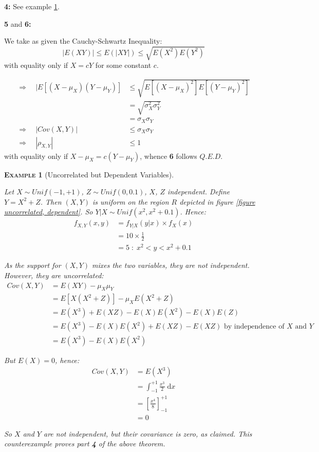\documentclass[12pt,a4paper]{article}
\newtheorem{example}{\textsc{Example}}[section]
\newcommand{\diff}{\mathrm{d}}
\begin{document}
\noindent\textbf{4: } See example \ref{uncorrelated, dependent}.

\noindent\textbf{5} and \textbf{6: }

\noindent We take as given the Cauchy-Schwartz Inequality:
$$|E(XY)| \leq E(|XY|) \leq \sqrt{E(X^2)E(Y^2)}$$
with equality only if $X = cY$ for some constant $c$.

\begin{align*}
\Rightarrow\quad |E[(X-\mu_X)(Y-\mu_Y)] &\leq \sqrt{E[(X-\mu_X)^2]E[(Y-\mu_Y)^2]}\\
&= \sqrt{\sigma_X^2\sigma_Y^2}\\
&= \sigma_X\sigma_Y\\
\Rightarrow \quad |Cov(X,Y)| &\leq \sigma_X\sigma_Y\\
\Rightarrow\quad |\rho_{X,Y}| &\leq 1
\end{align*}
with equality only if $X-\mu_X = c(Y-\mu_Y)$, whence \textbf{6} follows \hfill$Q.E.D.$

\begin{example}[Uncorrelated but Dependent Variables]\label{uncorrelated, dependent}$\;$\par\vspace{1cm}

Let $X \sim Unif(-1,+1)$, $Z \sim Unif(0,0.1)$, $X$, $Z$ independent. Define $Y=X^2 + Z$. Then $(X,Y)$ is uniform on the region $R$ depicted in figure \ref{figure uncorrelated, dependent}. So $Y|X \sim Unif(x^2,x^2+0.1)$. Hence:
\begin{align*}
f_{X,Y}(x,y) &= f_{Y|X}(y|x) \times f_X(x)\\
&= 10 \times \frac{1}{2}\\
&= 5 \; : \; x^2 < y < x^2 + 0.1
\end{align*}

As the support for $(X,Y)$ mixes the two variables, they are not independent. However, they are uncorrelated:
\begin{align*}
Cov(X,Y) &= E(XY) - \mu_X\mu_Y\\
&= E[X(X^2+Z)] - \mu_XE(X^2+Z)\\
&= E(X^3) + E(XZ) - E(X)E(X^2) - E(X)E(Z)\\
&= E(X^3)-E(X)E(X^2) + E(XZ) - E(XZ) \mbox{ by independence of $X$ and $Y$}\\
&=E(X^3)-E(X)E(X^2)
\end{align*}

But $E(X) = 0$, hence:
\begin{align*}
Cov(X,Y) &= E(X^3)\\
&= \int_{-1}^{+1}\!\! \frac{x^3}{2}\;\diff x\\
&= \left[\frac{x^4}{8}\right]_{-1}^{+1}\\
&= 0
\end{align*}

So $X$ and $Y$ are not independent, but their covariance is zero, as claimed. This counterexample proves part \textbf{4} of the above theorem.
\end{example}
\end{document}
